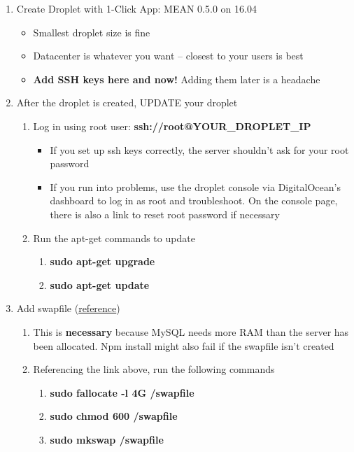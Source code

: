\documentclass{article}
\begin{document}
\begin{enumerate}
  \item Create Droplet with 1-Click App: MEAN 0.5.0 on 16.04
  \begin{itemize}
    \item Smallest droplet size is fine
    \item Datacenter is whatever you want -- closest to your users is best
    \item \textbf{Add SSH keys here and now!} Adding them later is a headache
  \end{itemize}
  \item After the droplet is created, UPDATE your droplet
  \begin{enumerate}
    \item Log in using root user: \textbf{ssh://root@YOUR\_DROPLET\_IP}
    \begin{itemize}
      \item If you set up ssh keys correctly, the server shouldn't ask for your root password
      \item If you run into problems, use the droplet console via DigitalOcean's dashboard to log in as root and troubleshoot. On the console page, there is also a link to reset root password if necessary
    \end{itemize}
    \item Run the apt-get commands to update
    \begin{enumerate}
      \item \textbf{sudo apt-get upgrade}
      \item \textbf{sudo apt-get update}
    \end{enumerate}
  \end{enumerate}
  \item Add swapfile (\href{https://www.digitalocean.com/community/tutorials/how-to-add-swap-on-ubuntu-14-04}{reference})
  \begin{enumerate}
    \item This is \textbf{necessary} because MySQL needs more RAM than the server has been allocated. Npm install might also fail if the swapfile isn't created
    \item Referencing the link above, run the following commands
    \begin{enumerate}
      \item \textbf{sudo fallocate -l 4G /swapfile}
      \item \textbf{sudo chmod 600 /swapfile}
      \item \textbf{sudo mkswap /swapfile}

\end{enumerate}
\end{enumerate}
\end{enumerate}
\end{document}
